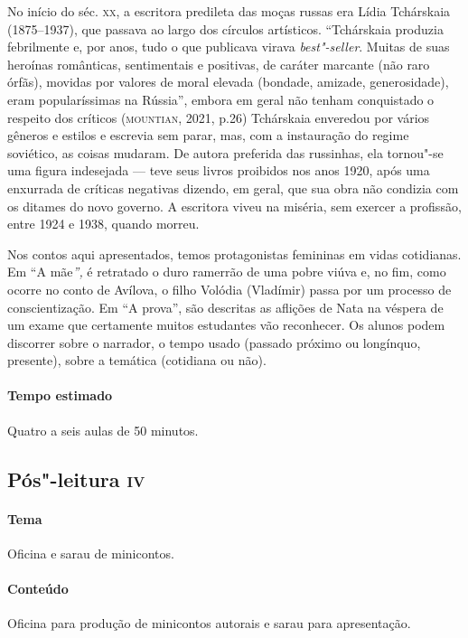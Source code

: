 \documentclass[11pt]{extarticle}
\begin{document}
No início do séc. \textsc{xx}, a escritora predileta das moças russas era Lídia
Tchárskaia (1875--1937), que passava ao largo dos círculos artísticos.
``Tchárskaia produzia febrilmente e, por anos, tudo o que publicava
virava \emph{best"-seller}. Muitas de suas heroínas românticas,
sentimentais e positivas, de caráter marcante (não raro órfãs), movidas
por valores de moral elevada (bondade, amizade, generosidade), eram
popularíssimas na Rússia'', embora em geral não tenham conquistado o
respeito dos críticos (\textsc{mountian}, 2021, p.26) Tchárskaia enveredou por
vários gêneros e estilos e escrevia sem parar, mas, com a instauração do
regime soviético, as coisas mudaram. De autora preferida das russinhas,
ela tornou"-se uma figura indesejada --- teve seus livros proibidos nos
anos 1920, após uma enxurrada de críticas negativas dizendo, em geral,
que sua obra não condizia com os ditames do novo governo. A escritora
viveu na miséria, sem exercer a profissão, entre 1924 e 1938, quando
morreu.

Nos contos aqui apresentados, temos protagonistas femininas em vidas
cotidianas. Em ``A mãe\emph{'',} é retratado o duro ramerrão de uma
pobre viúva e, no fim, como ocorre no conto de Avílova, o filho Volódia
(Vladímir) passa por um processo de conscientização. Em ``A prova'', são
descritas as aflições de Nata na véspera de um exame que certamente
muitos estudantes vão reconhecer. Os alunos podem discorrer sobre o
narrador, o tempo usado (passado próximo ou longínquo, presente), sobre
a temática (cotidiana ou não).

\paragraph{Tempo estimado} Quatro a seis aulas de 50 minutos.

\subsection{Pós"-leitura \textsc{iv}}

\paragraph{Tema} Oficina e sarau de minicontos.


\paragraph{Conteúdo}
Oficina para produção de minicontos autorais e sarau para apresentação.
\end{document}
